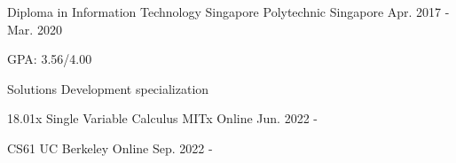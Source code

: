 

\begin{cventries}

  \cventry
    {Diploma in Information Technology} %
    {Singapore Polytechnic} %
    {Singapore} %
    {Apr. 2017 - Mar. 2020} %
    {
      \begin{cvitems} %
        \item {GPA: 3.56/4.00}
        \item {Solutions Development specialization}
      \end{cvitems}
    }

    \cventry
    {18.01x Single Variable Calculus} %
    {MITx} %
    {Online} %
    {Jun. 2022 - } %
    {
      \begin{cvitems} %
      \end{cvitems}
    }

    \cventry
    {CS61} %
    {UC Berkeley} %
    {Online} %
    {Sep. 2022 - } %
    {
      \begin{cvitems} %
      \end{cvitems}
    }


\end{cventries}
